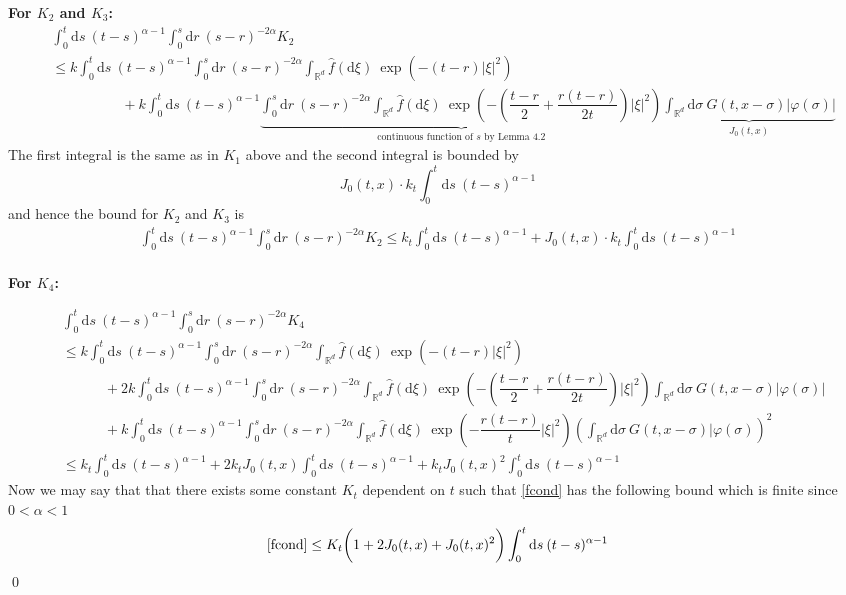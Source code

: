 \documentclass{article}
\numberwithin{equation}{section}
\newcommand{\R}{\mathbb{R}}
\newcommand{\ud}{\ensuremath{\mathrm{d}}}
\begin{document}
\noindent \textbf{For $K_2$ and $K_3$:} 
\begin{align*}
&\int_0^t \ud s \: (t-s)^{\alpha-1}\int_0^s \ud r \: (s-r)^{-2\alpha} K_2
\\&\le k\int_0^t \ud s \: (t-s)^{\alpha-1}\int_0^s \ud r \: (s-r)^{-2\alpha}\int_{\R^d}\hat f(\ud \xi)\: \exp\left(-(t-r)|\xi|^2\right)
\\&\hspace{5em}+ k\int_0^t \ud s \: (t-s)^{\alpha-1}\underbrace{\int_0^s \ud r \: (s-r)^{-2\alpha}\int_{\R^d}\hat f(\ud \xi)\: \exp\left(-\left(\dfrac{t-r}{2}+\dfrac{r(t-r)}{2t}\right)|\xi|^2\right)}_{\text{continuous function of $s$ by Lemma 4.2}}\underbrace{\int_{\R^d}\ud \sigma \:G(t,x-\sigma)|\varphi(\sigma)|}_{J_0(t,x)}
\end{align*}
The first integral is the same as in $K_1$ above and the second integral is bounded by $$ J_0(t,x)\cdot k_t \int_0^t \ud s \: (t-s)^{\alpha-1} $$
and hence the bound for $K_2$ and $K_3$ is 
\begin{align*}
\int_0^t \ud s \: (t-s)^{\alpha-1}\int_0^s \ud r \: (s-r)^{-2\alpha} K_2
\le k_t\int_0^t \ud s \: (t-s)^{\alpha-1} + J_0(t,x)\cdot k_t \int_0^t \ud s \: (t-s)^{\alpha-1}
\end{align*} \\

\noindent \textbf{For $K_4$:} 

\begin{align*}
&\int_0^t \ud s \: (t-s)^{\alpha-1}\int_0^s \ud r \: (s-r)^{-2\alpha} K_4
\\&\le k\int_0^t \ud s \: (t-s)^{\alpha-1}\int_0^s \ud r \: (s-r)^{-2\alpha}\int_{\R^d}\hat f(\ud \xi)\: \exp\left(-(t-r)|\xi|^2\right)
\\& \hspace{3em} + 2k\int_0^t \ud s \: (t-s)^{\alpha-1}\int_0^s \ud r \: (s-r)^{-2\alpha}\int_{\R^d}\hat f(\ud \xi)\: \exp\left(-\left(\dfrac{t-r}{2}+\dfrac{r(t-r)}{2t}\right)|\xi|^2\right)\int_{\R^d}\ud \sigma \:G(t,x-\sigma)|\varphi(\sigma)|
\\& \hspace{3em}+  k\int_0^t \ud s \: (t-s)^{\alpha-1}\int_0^s \ud r \: (s-r)^{-2\alpha}\int_{\R^d}\hat f(\ud \xi)\: \exp\left(-\dfrac{r(t-r)}{t}|\xi|^2\right)\left(\int_{\R^{d}}\ud \sigma \:G(t,x-\sigma)|\varphi(\sigma)\right)^2
\\&\le k_t\int_0^t \ud s \: (t-s)^{\alpha-1} + 2k_tJ_0(t,x)\int_0^t \ud s \: (t-s)^{\alpha-1}+k_tJ_0(t,x)^2\int_0^t \ud s \: (t-s)^{\alpha-1}
\end{align*}
Now we may say that that there exists some constant $K_t$ dependent on $t$ such that \eqref{fcond} has the following bound which is finite since $0<\alpha <1$
\begin{align*}
\eqref{fcond} \le K_t\bigg(1+2J_0(t,x)+J_0(t,x)^2\bigg)\int_0^t \ud s \: (t-s)^{\alpha-1}
\end{align*} \qed 
\end{document}
